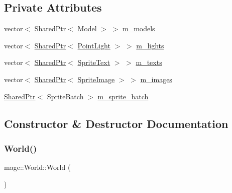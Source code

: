 \subsection*{Private Attributes}
\begin{DoxyCompactItemize}
\item 
vector$<$ \hyperlink{namespacemage_a1e01ae66713838a7a67d30e44c67703e}{Shared\+Ptr}$<$ \hyperlink{classmage_1_1_model}{Model} $>$ $>$ \hyperlink{classmage_1_1_world_ad69d681d960e32f62800bfcfa88d7737}{m\+\_\+models}
\item 
vector$<$ \hyperlink{namespacemage_a1e01ae66713838a7a67d30e44c67703e}{Shared\+Ptr}$<$ \hyperlink{classmage_1_1_point_light}{Point\+Light} $>$ $>$ \hyperlink{classmage_1_1_world_a781af9ce8b1e03c5c606e3523323005b}{m\+\_\+lights}
\item 
vector$<$ \hyperlink{namespacemage_a1e01ae66713838a7a67d30e44c67703e}{Shared\+Ptr}$<$ \hyperlink{classmage_1_1_sprite_text}{Sprite\+Text} $>$ $>$ \hyperlink{classmage_1_1_world_a38e19c4c5caf02633f406ecfd04a2e4d}{m\+\_\+texts}
\item 
vector$<$ \hyperlink{namespacemage_a1e01ae66713838a7a67d30e44c67703e}{Shared\+Ptr}$<$ \hyperlink{classmage_1_1_sprite_image}{Sprite\+Image} $>$ $>$ \hyperlink{classmage_1_1_world_a8c0f2183e71d368824bab701713c5792}{m\+\_\+images}
\item 
\hyperlink{namespacemage_a1e01ae66713838a7a67d30e44c67703e}{Shared\+Ptr}$<$ Sprite\+Batch $>$ \hyperlink{classmage_1_1_world_abb5d26cbfbd7b5792a53359b823c9f37}{m\+\_\+sprite\+\_\+batch}
\end{DoxyCompactItemize}


\subsection{Constructor \& Destructor Documentation}
\hypertarget{classmage_1_1_world_a4b3883a575dcfb8c1f542ecb5938ddc5}{}\label{classmage_1_1_world_a4b3883a575dcfb8c1f542ecb5938ddc5} 
\subsubsection{\texorpdfstring{World()}{World()}\hspace{0.1cm}{\footnotesize\ttfamily [1/3]}}
{\footnotesize\ttfamily mage\+::\+World\+::\+World (\begin{DoxyParamCaption}{ }\end{DoxyParamCaption})}

